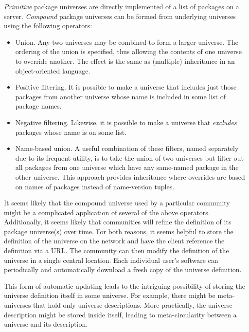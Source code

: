 \documentclass{article}
\begin{document}
\emph{Primitive} package universes are directly implemented of a list
of packages on a server.  \emph{Compound} package universes can be
formed from underlying universes using the following operators:
\begin{itemize}
\item Union.  Any two universes may be combined to form a larger
      universe.  The ordering of the union is specified, thus allowing
      the contents of one universe to override another.  The effect
      is the same as (multiple) inheritance in an object-oriented language.

\item Positive filtering.  It is possible to make a universe that
      includes just those packages from another universe whose
      name is included in some list of package names.

\item Negative filtering.  Likewise, it is possible to make a universe
      that \emph{excludes} packages whose name is on some list.

\item Name-based union.  A useful combination of these filters, named
      separately due to its frequent utility, is to take the union of
      two universes but filter out all packages from one universe
      which have any same-named package in the other universe.  This
      approach provides inheritance where overrides are based on names
      of packages instead of name-version tuples.
\end{itemize}


It seems likely that the compound universe used by a particular
community might be a complicated application of several of the above
operators.  Additionally, it seems likely that communities will
refine the definition of its package universe(s) over time.  For both
reasons, it seems helpful to store the definition of the universe on
the network and have the client reference the definition via a URL.
The community can then modify the definition of the universe in a
single central location.  Each individual user's software can
periodically and automatically download a fresh copy of the universe
definition.

This form of automatic updating leads to the intriguing possibility of
storing the universe definition itself in some universe.  For example,
there might be meta-universes that hold only universe descriptions.
More practically, the universe description might be stored inside
itself, leading to meta-circularity between a universe and its
description.
\end{document}
